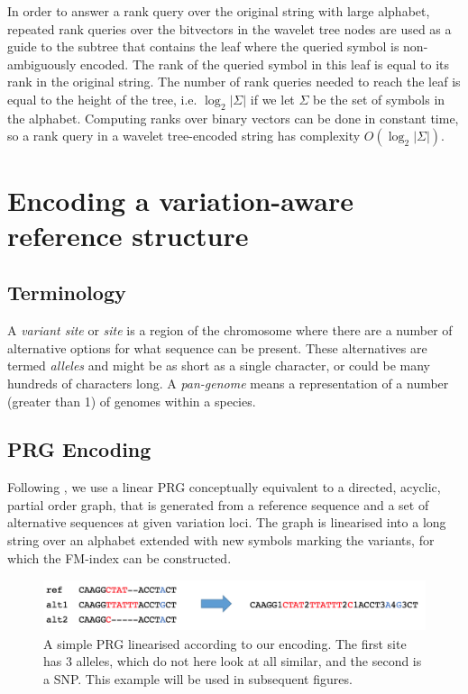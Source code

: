 \documentclass[runningheads,a4paper]{llncs}
\begin{document}
In order to answer a rank query over the original string with large alphabet, repeated rank queries over the bitvectors in the wavelet tree nodes are used as a guide to the  subtree that contains the leaf where the queried symbol is non-ambiguously encoded. The rank of the queried symbol in this leaf is equal to its rank in the original string. The number of rank queries needed to reach the leaf is equal to the height of the tree, i.e. $\log_{2} {|\Sigma|}$ if we let $\Sigma$ be the set of symbols in the alphabet. Computing ranks over binary vectors can be done in constant time, so a rank query in a wavelet tree-encoded string has complexity $O(\log_{2} {|\Sigma|})$. 

\section{Encoding a variation-aware reference structure}

\subsection{Terminology}
A \textit{variant site} or \textit{site} is a region of the chromosome where there are a number of alternative options for what sequence can be present.
These alternatives are termed \textit{alleles} and might be as short as a single character, or could be many hundreds of characters long. A  \textit{pan-genome} means a representation of a number (greater than 1) of genomes within a species. 

\subsection{PRG Encoding}



Following \cite{dilthey}, we use a linear PRG conceptually equivalent to a directed, acyclic, partial order graph, that is generated from a reference sequence and a set of alternative sequences at given variation loci. The graph is linearised into a long string over an alphabet extended with new symbols marking the variants, for which the FM-index can be constructed. 


\begin{figure}
\centering
\includegraphics[height=1.5cm]{linPRG}
\caption{A simple PRG linearised according to our encoding. The first site has 3 alleles, which do not here look at all similar, and the second is a SNP. This example will be used in subsequent figures.}
\label{lab}
\end{figure}
\end{document}
